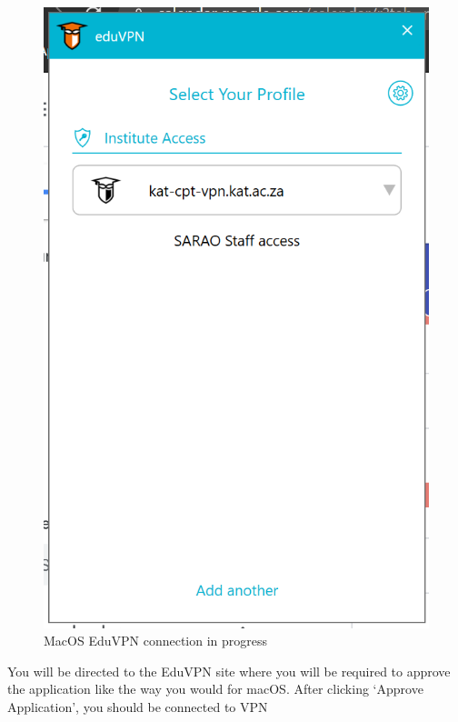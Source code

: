 \begin{figure}[!thb]
	\centering
	\includegraphics[scale=0.3]{Chapters/images/image111.png}
	
	\caption{MacOS EduVPN connection in progress }
	\label{fig:image111}
\end{figure}
You will be directed to the EduVPN site where you will be required to approve the application like the way you would for macOS. After clicking ‘Approve Application’, you should be connected to VPN
